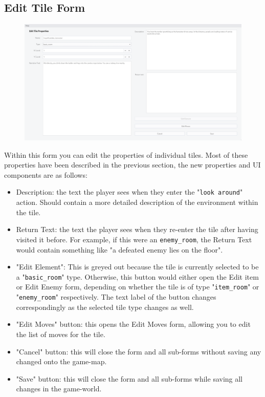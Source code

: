 \documentclass{article} \usepackage[margin=1in,headheight=57pt,headsep=0.1in]{geometry}
\begin{document}
\subsection{Edit Tile Form}
\begin{figure}[H]
	\centering
	\includegraphics[width=1.0\textwidth]{./editTileFormBasic.png}
\end{figure}
Within this form you can edit the properties of individual tiles. Most of these properties have been described in the previous section, the new properties and UI components are as follows:
\begin{itemize}
	\item Description: the text the player sees when they enter the "\texttt{look around}" action. Should contain a more detailed description of the environment within the tile.
	\item Return Text: the text the player sees when they re-enter the tile after having visited it before. For example, if this were an \texttt{enemy\_room}, the Return Text would contain something like "a defeated enemy lies on the floor".
	\item "Edit Element": This is greyed out because the tile is currently selected to be a "\texttt{basic\_room}" type. Otherwise, this button would either open the Edit item or Edit Enemy form, depending on whether the tile is of type "\texttt{item\_room}" or "\texttt{enemy\_room}" respectively. The text label of the button changes correspondingly as the selected tile type changes as well.
	\item "Edit Moves" button: this opens the Edit Moves form, allowing you to edit the list of moves for the tile.
	\item "Cancel" button: this will close the form and all sub-forms without saving any changed onto the game-map.
	\item "Save" button: this will close the form and all sub-forms while saving all changes in the game-world.
\end{itemize}
\newpage
\end{document}
